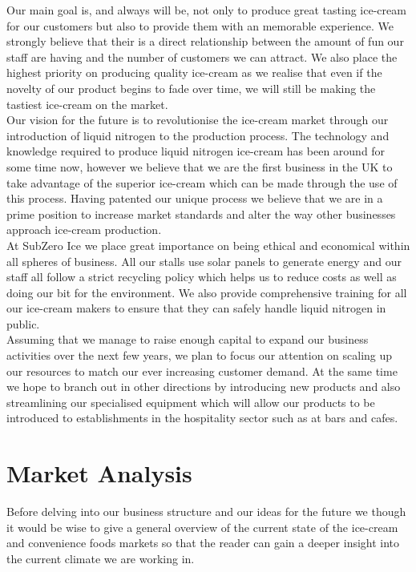 \documentclass{article}
\begin{document}
Our main goal is, and always will be, not only to produce great tasting ice-cream for our customers but also to provide them with an memorable experience. We strongly believe that their is a direct relationship between the amount of fun our staff are having and the number of customers we can attract. We also place the highest priority on producing quality ice-cream as we realise that even if the novelty of our product begins to fade over time, we will still be making the tastiest ice-cream on the market. \\

Our vision for the future is to revolutionise the ice-cream market through our introduction of liquid nitrogen to the production process. The technology and knowledge required to produce liquid nitrogen ice-cream has been around for some time now, however we believe that we are the first business in the UK to take advantage of the superior ice-cream which can be made through the use of this process. Having patented our unique process we believe that we are in a prime position to increase market standards and alter the way other businesses approach ice-cream production. \\

At SubZero Ice we place great importance on being ethical and economical within all spheres of business. All our stalls use solar panels to generate energy and our staff all follow a strict recycling policy which helps us to reduce costs as well as doing our bit for the environment. We also provide comprehensive training for all our ice-cream makers to ensure that they can safely handle liquid nitrogen in public. \\

Assuming that we manage to raise enough capital to expand our business activities over the next few years, we plan to focus our attention on scaling up our resources to match our ever increasing customer demand. At the same time we hope to branch out in other directions by introducing new products and also streamlining our specialised equipment which will allow our products to be introduced to establishments in the hospitality sector such as at bars and cafes. \\

\section{Market Analysis}
  
  Before delving into our business structure and our ideas for the future we though it would be wise to give a general overview of the current state of the ice-cream and convenience foods markets so that the reader can gain a deeper insight into the current climate we are working in.
\end{document}

